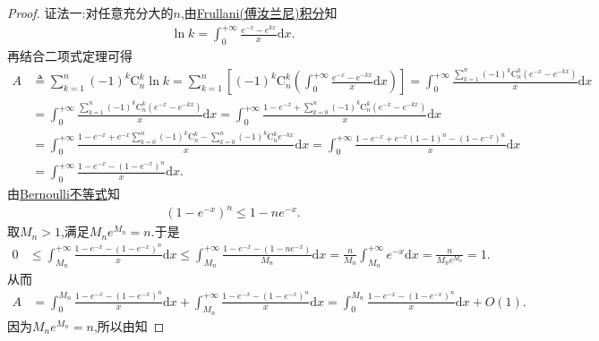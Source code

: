 \documentclass[../../main.tex]{subfiles}
\begin{document}
\begin{proof}
{\color{blue}证法一:}对任意充分大的$n$,由\hyperref[theorem:Frullani(傅汝兰尼)积分]{Frullani(傅汝兰尼)积分}知
\begin{align*}
\ln k = \int_0^{+\infty}{\frac{e^{-x}-e^{kx}}{x}\mathrm{d}x}.
\end{align*}
再结合二项式定理可得
\begin{align*}
A&\triangleq \sum_{k=1}^n{\left( -1 \right) ^k\mathrm{C}_{n}^{k}\ln k}=\sum\limits_{k=1}^n{\left[ \left( -1 \right) ^k\mathrm{C}_{n}^{k}\left( \int_0^{+\infty}{\frac{e^{-x}-e^{-kx}}{x}\mathrm{d}x} \right) \right]}=\int_0^{+\infty}{\frac{\sum\limits_{k=1}^n{\left( -1 \right) ^k\mathrm{C}_{n}^{k}}\left( e^{-x}-e^{-kx} \right)}{x}\mathrm{d}x} \\
&=\int_0^{+\infty}{\frac{\sum\limits_{k=1}^n{\left( -1 \right) ^k\mathrm{C}_{n}^{k}}\left( e^{-x}-e^{-kx} \right)}{x}\mathrm{d}x}=\int_0^{+\infty}{\frac{1-e^{-x}+\sum\limits_{k=0}^n{\left( -1 \right) ^k\mathrm{C}_{n}^{k}}\left( e^{-x}-e^{-kx} \right)}{x}\mathrm{d}x} \\
&=\int_0^{+\infty}{\frac{1-e^{-x}+e^{-x}\sum\limits_{k=0}^n{\left( -1 \right) ^k\mathrm{C}_{n}^{k}}-\sum\limits_{k=0}^n{\left( -1 \right) ^k\mathrm{C}_{n}^{k}}e^{-kx}}{x}\mathrm{d}x}=\int_0^{+\infty}{\frac{1-e^{-x}+e^{-x}\left( 1-1 \right) ^n-\left( 1-e^{-x} \right) ^n}{x}\mathrm{d}x} \\
&=\int_0^{+\infty}{\frac{1-e^{-x}-\left( 1-e^{-x} \right) ^n}{x}\mathrm{d}x}.
\end{align*}
由\hyperref[theorem:Bernoulli不等式]{Bernoulli不等式}知
\begin{align*}
\left( 1-e^{-x} \right) ^n\leqslant 1-ne^{-x}.
\end{align*}
取$M_n>1$,满足$M_ne^{M_n}=n$.于是
\begin{align*}
0&\leqslant \int_{M_n}^{+\infty}{\frac{1-e^{-x}-\left( 1-e^{-x} \right) ^n}{x}\mathrm{d}x}\leqslant \int_{M_n}^{+\infty}{\frac{1-e^{-x}-\left( 1-ne^{-x} \right)}{M_n}\mathrm{d}x}=\frac{n}{M_n}\int_{M_n}^{+\infty}{e^{-x}\mathrm{d}x}=\frac{n}{M_ne^{M_n}}=1.
\end{align*}
从而
\begin{align}
A&=\int_0^{M_n}{\frac{1-e^{-x}-\left( 1-e^{-x} \right) ^n}{x}\mathrm{d}x}+\int_{M_n}^{+\infty}{\frac{1-e^{-x}-\left( 1-e^{-x} \right) ^n}{x}\mathrm{d}x}=\int_0^{M_n}{\frac{1-e^{-x}-\left( 1-e^{-x} \right) ^n}{x}\mathrm{d}x}+O\left( 1 \right) .\label{eq:109.10009}
\end{align}
因为$M_ne^{M_n}=n$,所以由知

\end{proof}
\end{document}
